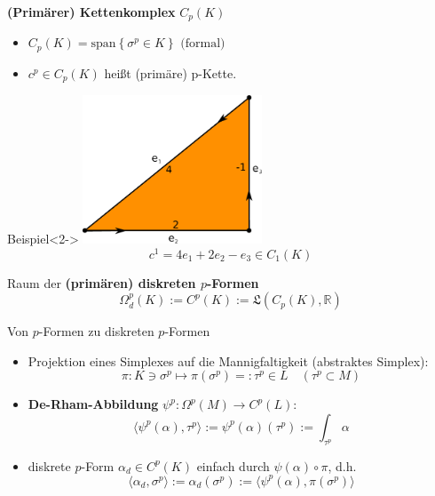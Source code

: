 \documentclass{beamer}
\newcommand{\R}{\mathds{R}}
\begin{document}
  \begin{frame}
    \begin{block}{\textbf{{}(Primärer) Kettenkomplex} \( C_{p}(K) \)}
      \begin{itemize}
        \item \( C_{p}(K) = \text{span}\left\{ \sigma^{p} \in K \right\} \text{ (formal)}\)
        \item<2-> \( c^{p} \in C_{p}(K) \) heißt (primäre) p-Kette.
      \end{itemize}
    \end{block}
    \begin{block}{Beispiel}<2->
      \centering\includegraphics[width=0.4\textwidth]{bilder/inkscape/bspKette.eps}
      \[ c^{1} =  4e_{1} + 2e_{2} - e_{3} \in C_{1}(K) \]
    \end{block}
  \end{frame}

  \begin{frame}
    \begin{block}{Raum der \textbf{(primären) diskreten \( p \)-Formen} }
      \[ \Omega^{p}_{d}(K) := C^{p}(K) := \mathfrak{L}(C_{p}(K), \R) \]
    \end{block}
    \pause
    \begin{block}{Von \( p \)-Formen zu diskreten \( p \)-Formen}
      \begin{itemize}
        \item Projektion eines Simplexes auf die Mannigfaltigkeit (abstraktes Simplex):
          \[ \pi: K \ni \sigma^{p} \longmapsto \pi(\sigma^{p}) =: \tau^{p} \in L \quad (\tau^{p} \subset M)  \]
        \item<3-> \textbf{De-Rham-Abbildung} \( \psi^{p}: \Omega^{p}(M) \rightarrow C^{p}(L)\):
          \[ \langle\psi^{p}(\alpha) , \tau^{p} \rangle := \psi^{p}(\alpha)(\tau^{p}) :=\int_{\tau^{p}} \alpha  \]
        \item<4-> diskrete \( p \)-Form \( \alpha_{d} \in C^{p}(K)\) einfach durch \( \psi(\alpha)\circ\pi \), d.h. 
          \[ \langle \alpha_{d} , \sigma^{p} \rangle := \alpha_{d}(\sigma^{p}) := \langle \psi^{p}(\alpha) , \pi(\sigma^{p}) \rangle\]
      \end{itemize}
    \end{block}
  \end{frame}
 
\end{document}
